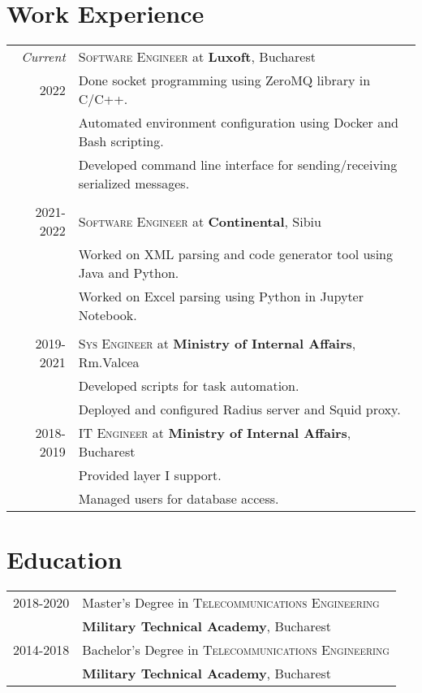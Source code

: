 \documentclass[a4paper,12pt]{article}
\begin{document}
\section{Work Experience}
\begin{tabular}{r|p{12cm}}
\emph{Current}
&\textsc{Software Engineer} at \textbf{Luxoft}, Bucharest\\
\textsc{2022}
&\footnotesize{Done socket programming using ZeroMQ library in C/C++.}\\
&\footnotesize{Automated environment configuration using Docker and Bash scripting.}\\
&\footnotesize{Developed command line interface for sending/receiving serialized messages.}\\
\multicolumn{2}{c}{}\\
\textsc{2021-2022}
&\textsc{Software Engineer} at \textbf{Continental}, Sibiu\\
&\footnotesize{Worked on XML parsing and code generator tool using Java and Python.}\\
&\footnotesize{Worked on Excel parsing using Python in Jupyter Notebook.}\\
\multicolumn{2}{c}{}\\
\textsc{2019-2021} 
  &\textsc{Sys Engineer} at \textbf{Ministry of Internal Affairs}, Rm.Valcea\\
&\footnotesize{
  Developed scripts for task automation.}\\
&\footnotesize{
  Deployed and configured Radius server and Squid proxy.}\\
\textsc{2018-2019} 
&\textsc{IT Engineer} at \textbf{Ministry of Internal Affairs}, Bucharest\\
&\footnotesize{Provided layer I support.}\\
&\footnotesize{Managed users for database access.}\\
\end{tabular}

\section{Education}
\begin{tabular}{rl}
\textsc{2018-2020}&Master's Degree in 
  \textsc{Telecommunications Engineering}\\
  &\textbf{Military Technical Academy}, Bucharest\\
\textsc{2014-2018}&Bachelor's Degree in
  \textsc{Telecommunications Engineering}\\
  &\textbf{Military Technical Academy}, Bucharest\\
\end{tabular}
\end{document}
